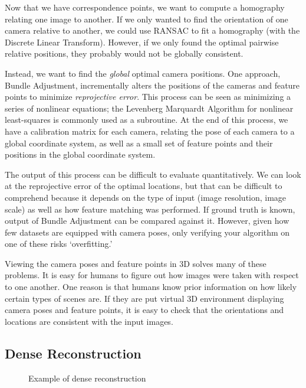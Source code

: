 \documentclass[10pt,twocolumn,letterpaper]{article}
\begin{document}
Now that we have correspondence points, we want to compute a homography relating one image to another. If we only wanted to find the orientation of one camera relative to another, we could use RANSAC to fit a homography (with the Discrete Linear Transform).\cite{ransac} However, if we only found the optimal pairwise relative positions, they probably would not be globally consistent.

Instead, we want to find the \emph{global} optimal camera positions. One approach, Bundle Adjustment, incrementally alters the positions of the cameras and feature points to minimize \emph{reprojective error}. This process can be seen as minimizing a series of nonlinear equations; the Levenberg Marquardt Algorithm for nonlinear least-squares is commonly used as a subroutine. At the end of this process, we have a calibration matrix for each camera, relating the pose of each camera to a global coordinate system, as well as a small set of feature points and their positions in the global coordinate system.\cite{snavely, sba}

The output of this process can be difficult to evaluate quantitatively. We can look at the reprojective error of the optimal locations, but that can be difficult to comprehend because it depends on the type of input (image resolution, image scale) as well as how feature matching was performed. If ground truth is known, output of Bundle Adjustment can be compared against it. However, given how few datasets are equipped with camera poses, only verifying your algorithm on one of these risks `overfitting.'

Viewing the camera poses and feature points in 3D solves many of these problems. It is easy for humans to figure out how images were taken with respect to one another. One reason is that humans know prior information on how likely certain types of scenes are. If they are put virtual 3D environment displaying camera poses and feature points, it is easy to check that the orientations and locations are consistent with the input images. 

\subsection{Dense Reconstruction}

\begin{figure}[t]
  \begin{center}
    \fbox{\rule{0pt}{2in} \rule{0.9\linewidth}{0pt}}
  \end{center}
  \caption{Example of dense reconstruction}
\end{figure}
\end{document}
